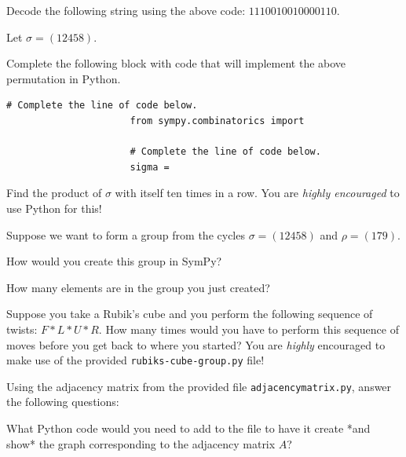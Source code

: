 \documentclass[exam, 12pt]{wvwcdocs}
\begin{document}
\begin{questions}
\begin{parts}
              \qpart\label{part:summer}
              Decode the following string using the above code: \( 1110010010000110 \).


          \end{parts}

          \question[10]\label{ques:sympy-permutations}
          Let \( \sigma = (12458) \).
          \begin{parts}
              \qpart\label{part:sympy-code}
              Complete the following block with code that will implement the above permutation in Python.
              \begin{lstlisting}[gobble=22]
                      # Complete the line of code below.
                      from sympy.combinatorics import

                      # Complete the line of code below.
                      sigma =

                  \end{lstlisting}


              \qpart\label{part:product}
              Find the product of \( \sigma \) with itself ten times in a row.
              You are \textit{highly encouraged} to use Python for this!


          \end{parts}

          \question[10]\label{ques:group-in-python}
          Suppose we want to form a group from the cycles \( \sigma = (12458) \) and \( \rho = (179) \).
          \begin{parts}
              \qpart\label{part:sympy-code}
              How would you create this group in SymPy?


              \qpart\label{part:number-of-elements}
              How many elements are in the group you just created?

          \end{parts}

          \question[10]\label{ques:rubik-cube-move-order}
          Suppose you take a Rubik's cube and you perform the following sequence of twists: \( F*L*U*R \).
          How many times would you have to perform this sequence of moves before you get back to where you started?
          You are \textit{highly} encouraged to make use of the provided \texttt{rubiks-cube-group.py} file!


          \question[10]\label{ques:graph-adjacency-matrix} Using the adjacency matrix from the provided file \texttt{adjacency\textunderscore{}matrix.py}, answer the following questions:
          \begin{parts}
              \qpart\label{part:code-for-graph}
              What Python code would you need to add to the file to have it create *and show* the graph corresponding to the adjacency matrix \( A \)?



\end{parts}
\end{questions}
\end{document}
